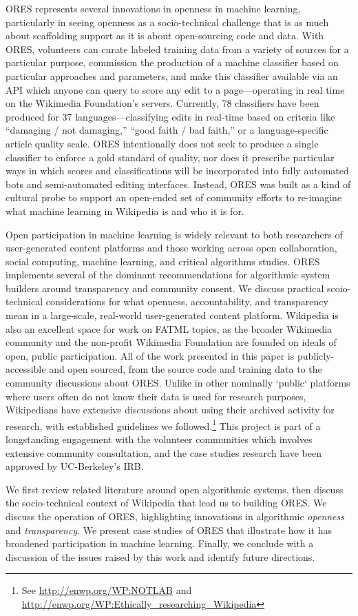 ORES represents several innovations in openness in machine learning, particularly in seeing openness as a socio-technical challenge that is as much about scaffolding support as it is about open-sourcing code and data. With ORES, volunteers can curate labeled training data from a variety of sources for a particular purpose, commission the production of a machine classifier based on particular approaches and parameters, and make this classifier available via an API which anyone can query to score any edit to a page---operating in real time on the Wikimedia Foundation's servers. Currently, 78 classifiers have been produced for 37 languages---classifying edits in real-time based on criteria like ``damaging / not damaging,'' ``good faith / bad faith,'' or a language-specific article quality scale. ORES intentionally does not seek to produce a single classifier to enforce a gold standard of quality, nor does it prescribe particular ways in which scores and classifications will be incorporated into fully automated bots and semi-automated editing interfaces. Instead, ORES was built as a kind of cultural probe \cite{hutchinson2003technology} to support an open-ended set of community efforts to re-imagine what machine learning in Wikipedia is and who it is for.

Open participation in machine learning is widely relevant to both researchers of user-generated content platforms and those working across open collaboration, social computing, machine learning, and critical algorithms studies. ORES implements several of the dominant recommendations for algorithmic system builders around transparency and community consent\cite{crawford2016algorithm,diakopoulos2015algorithmic,sandvig2014auditing}. We discuss practical scoio-technical considerations for what openness, accountability, and transparency mean in a large-scale, real-world user-generated content platform. Wikipedia is also an excellent space for work on FATML topics, as the broader Wikimedia community and the non-profit Wikimedia Foundation are founded on ideals of open, public participation. All of the work presented in this paper is publicly-accessible and open sourced, from the source code and training data to the community discussions about ORES. Unlike in other nominally `public` platforms where users often do not know their data is used for research purposes, Wikipedians have extensive discussions about using their archived activity for research, with established guidelines we followed.\footnote{See \url{http://enwp.org/WP:NOTLAB} and \url{http://enwp.org/WP:Ethically_researching_Wikipedia}} This project is part of a longstanding engagement with the volunteer communities which involves extensive community consultation, and the case studies research have been approved by UC-Berkeley's IRB.

We first review related literature around open algorithmic systems, then discuss the socio-technical context of Wikipedia that lead us to building ORES. We discuss the operation of ORES, highlighting innovations in algorithmic \emph{openness} and \emph{transparency}. We present case studies of ORES that illustrate how it has broadened participation in machine learning.  Finally, we conclude with a discussion of the issues raised by this work and identify future directions.
